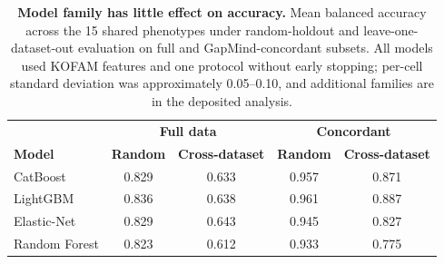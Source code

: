 \begin{table}[p]
\centering
\begin{tabular}{lcccc}
\hline
 & \multicolumn{2}{c}{\textbf{Full data}} & \multicolumn{2}{c}{\textbf{Concordant}} \\
\textbf{Model} & \textbf{Random} & \textbf{Cross-dataset} & \textbf{Random} & \textbf{Cross-dataset} \\
\hline
CatBoost      & 0.829 & 0.633 & 0.957 & 0.871 \\
LightGBM      & 0.836 & 0.638 & 0.961 & 0.887 \\
Elastic-Net   & 0.829 & 0.643 & 0.945 & 0.827 \\
Random Forest & 0.823 & 0.612 & 0.933 & 0.775 \\
\hline
\end{tabular}
\caption{\textbf{Model family has little effect on accuracy.}
Mean balanced accuracy across the 15 shared phenotypes under random-holdout and leave-one-dataset-out evaluation on full and GapMind-concordant subsets.
All models used KOFAM features and one protocol without early stopping; per-cell standard deviation was approximately 0.05--0.10, and additional families are in the deposited analysis.}
\label{tab:best_models_counts}
\end{table}
\clearpage


\clearpage